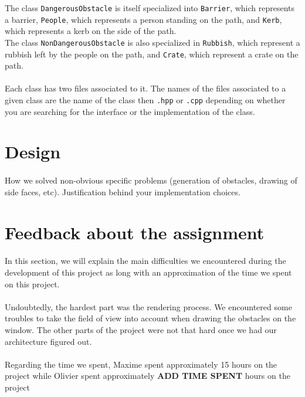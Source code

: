 \documentclass[a4paper, 11pt, oneside]{article}
\begin{document}
The class \texttt{DangerousObstacle} is itself specialized into \texttt{Barrier}, which represents a barrier, \texttt{People}, which represents a person standing on the path, and \texttt{Kerb}, which represents a kerb on the side of the path.\\ \newline
The class \texttt{NonDangerousObstacle} is also specialized in \texttt{Rubbish}, which represent a rubbish left by the people on the path, and \texttt{Crate}, which represent a crate on the path.

\paragraph{}Each class has two files associated to it. The names of the files associated to a given class are the name of the class then \texttt{.hpp} or \texttt{.cpp} depending on whether you are searching for the interface or the implementation of the class.



\section{Design}
\paragraph{}How we solved non-obvious specific problems (generation of obstacles, drawing of side faces, etc). Justification behind your implementation choices.


\section{Feedback about the assignment}
\paragraph{}In this section, we will explain the main difficulties we encountered during the development of this project as long with an approximation of the time we spent on this project.
\paragraph{}Undoubtedly, the hardest part was the rendering process. We encountered some troubles to take the field of view into account when drawing the obstacles on the window. The other parts of the project were not that hard once we had our architecture figured out.
\paragraph{}Regarding the time we spent, Maxime spent approximately 15 hours on the project while Olivier spent approximately \textbf{ADD TIME SPENT} hours on the project 

\end{document}
